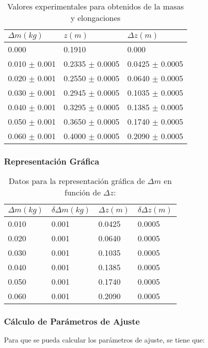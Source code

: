 \documentclass[a4paper,12pt]{article}
\begin{document}
\begin{table}[h!]
  \centering
  \caption{Valores experimentales para obtenidos de la masas y elongaciones}
  \begin{tabular}{|l|l|l|}
  \hline
  $\Delta m (kg)$ & $z (m)$ & $\Delta z(m)$\\
  \hline
  0.000 & 0.1910 & 0.000\\
  \hline
  0.010 $\pm$ 0.001 & 0.2335  $\pm$ 0.0005 & 0.0425  $\pm$ 0.0005\\
  \hline
  0.020  $\pm$ 0.001 & 0.2550  $\pm$ 0.0005 & 0.0640  $\pm$ 0.0005\\
  \hline
  0.030  $\pm$ 0.001 & 0.2945 $\pm$  0.0005 & 0.1035 $\pm$ 0.0005\\
  \hline
  0.040 $\pm$ 0.001 & 0.3295 $\pm$ 0.0005 & 0.1385  $\pm$ 0.0005\\ 
  \hline
  0.050  $\pm$ 0.001 & 0.3650  $\pm$ 0.0005 & 0.1740  $\pm$ 0.0005 \\ 
  \hline
  0.060  $\pm$ 0.001 & 0.4000  $\pm$ 0.0005 &  0.2090  $\pm$ 0.0005 \\
  \hline
  \end{tabular}
\end{table}

\subsubsection{Representación Gráfica}

\begin{table}[h!]
  \centering
  \caption{Datos para la representación gráfica de $\Delta m$ en función de $\Delta z$:}
  \begin{tabular}{|l|l|l|l|}
  \hline
  $\Delta m (kg)$ & $\delta \Delta m(kg) $& $\Delta z (m)$ & $\delta \Delta z (m)$\\
  \hline
  0.010 & 0.001 & 0.0425 & 0.0005 \\
  \hline
  0.020 & 0.001 & 0.0640 & 0.0005 \\
  \hline
  0.030 & 0.001 & 0.1035 & 0.0005 \\
  \hline
  0.040 & 0.001 & 0.1385 & 0.0005 \\
  \hline
  0.050 & 0.001 & 0.1740 & 0.0005\\
  \hline
  0.060 & 0.001 & 0.2090 & 0.0005\\
  \hline
  \end{tabular}
\end{table}
\pagebreak

\subsubsection{Cálculo de Parámetros de Ajuste}
Para que se pueda calcular los parámetros de ajuste, se tiene que:
\end{document}
